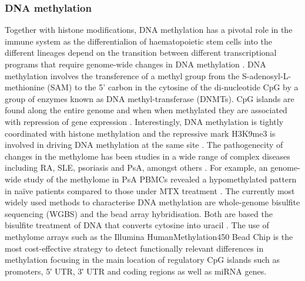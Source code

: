 \subsubsection{DNA methylation}
Together with histone modifications, DNA methylation has a pivotal role in the immune system as the differentialion of haematopoietic stem cells into the different lineages depend on the transition between different transcriptional programs that require genome-wide changes in DNA methylation \parencite{Sellars2015,Lai2013}. DNA methylation involves the transference of a methyl group from the S-adenosyl-L-methionine (SAM) to the 5' carbon in the cytosine of the di-nucleotide CpG by a group of enzymes known as DNA methyl-transferase (DNMTs). CpG islands are found along the entire genome and when when methylated they are associated with repression of gene expression \parencite{Herman2003}. Interestingly, DNA methylation is tightly coordinated with histone methylation and the repressive mark H3K9me3 is involved in driving DNA methylation at the same site \parencite{Rottach2009}. %
The pathogenecity of changes in the methylome has been studies in a wide range of complex diseases including RA, SLE, psoriasis and PsA, amongst others \parencite{Lei2009,Liu2013,Zhang2010}. For example, an genome-wide study of the methylome in PsA PBMCs revealed a hypomethylated pattern in na\"{i}ve patients compared to those under MTX treatment \parencite{Kim1996}.
The currently most widely used methods to characterise DNA methylation are whole-genome bisulfite sequencing (WGBS) and the bead array hybridisation. Both are based the bisulfite treatment of DNA that converts cytosine into uracil \parencite{Frommer1992,Miura2014,Dedeurwaerder2013}. The use of methylome arrays such as the Illumina HumanMethylation450 Bead Chip is the most cost-effective strategy to detect functionally relevant differences in methylation focusing in the main location of regulatory CpG islands such as promoters, 5′ UTR, 3′ UTR and coding regions as well as miRNA genes.

